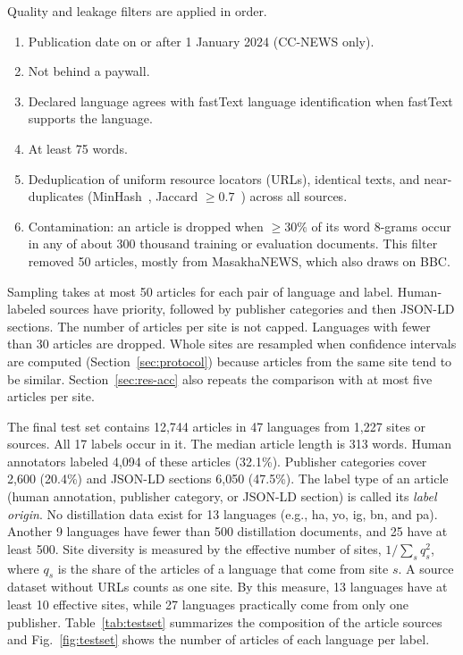 \documentclass[journal]{IEEEtran}
\begin{document}
Quality and leakage filters are applied in order.
\begin{enumerate}
  \item Publication date on or after 1 January 2024 (CC-NEWS only).
  \item Not behind a paywall.
  \item Declared language agrees with fastText language identification when fastText supports the language.
  \item At least 75 words.
  \item Deduplication of uniform resource locators (URLs), identical texts, and near-duplicates (MinHash~\cite{broder1997resemblance}, Jaccard $\ge 0.7$~\cite{lee2022dedup}) across all sources.
  \item Contamination: an article is dropped when $\ge 30\%$ of its word 8-grams occur in any of about 300 thousand training or evaluation documents. This filter removed 50 articles, mostly from MasakhaNEWS, which also draws on BBC.
\end{enumerate}

Sampling takes at most 50 articles for each pair of language and label. Human-labeled sources have priority, followed by publisher categories and then JSON-LD sections. The number of articles per site is not capped. Languages with fewer than 30 articles are dropped. Whole sites are resampled when confidence intervals are computed (Section~\ref{sec:protocol}) because articles from the same site tend to be similar. Section~\ref{sec:res-acc} also repeats the comparison with at most five articles per site.

The final test set contains 12,744 articles in 47 languages from 1,227 sites or sources. All 17 labels occur in it. The median article length is 313 words. Human annotators labeled 4,094 of these articles (32.1\%). Publisher categories cover 2,600 (20.4\%) and JSON-LD sections 6,050 (47.5\%). The label type of an article (human annotation, publisher category, or JSON-LD section) is called its \emph{label origin}. No distillation data exist for 13 languages (e.g., ha, yo, ig, bn, and pa). Another 9 languages have fewer than 500 distillation documents, and 25 have at least 500. Site diversity is measured by the effective number of sites, $1/\sum_s q_s^{2}$, where $q_s$ is the share of the articles of a language that come from site $s$. A source dataset without URLs counts as one site. By this measure, 13 languages have at least 10 effective sites, while 27 languages practically come from only one publisher. Table~\ref{tab:testset} summarizes the composition of the article sources and Fig.~\ref{fig:testset} shows the number of articles of each language per label.
\end{document}
